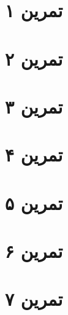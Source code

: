 \documentclass[11pt]{article}
\begin{document}
\section*{تمرین ۱}

\pagebreak
\section*{تمرین ۲}

\section*{تمرین ۳}

\section*{تمرین ۴}

\section*{تمرین ۵}

\vspace{1cm}
\section*{تمرین ۶}

\pagebreak
\section*{تمرین ۷}

\end{document}

